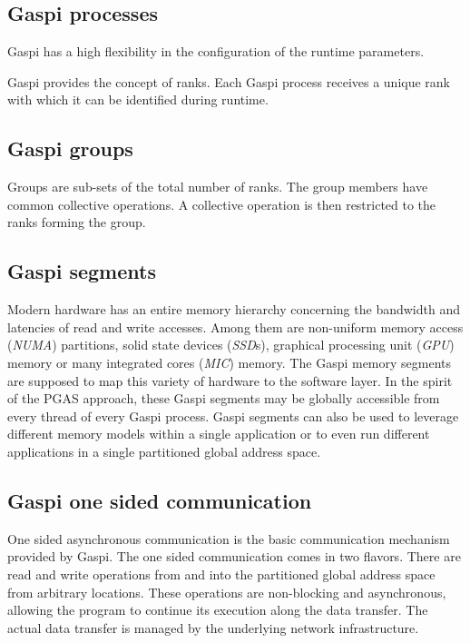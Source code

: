\documentclass{article}
\newlength{\st}\setlength{\st}{0pt}
\newcommand{\GASPI}{{\sc Gaspi}}
\begin{document}
\subsection{\GASPI{} processes}

\GASPI{} has a high flexibility in the configuration of the runtime
parameters.

\GASPI{} provides the concept of ranks. Each \GASPI{} process receives
a unique rank with which it can be identified during runtime.

\subsection{\GASPI{} groups}

Groups are sub-sets of the total number of ranks.  The group members
have common collective operations. A collective operation is then
restricted to the ranks forming the group.

\subsection{\GASPI{} segments}

Modern hardware has an entire memory hierarchy concerning the
bandwidth and latencies of read and write accesses. Among them are
non-uniform memory access (\emph{NUMA}) partitions, solid state
devices (\emph{SSD}s), graphical processing unit (\emph{GPU}) memory
or many integrated cores (\emph{MIC}) memory.  The \GASPI{} memory
segments are supposed to map this variety of hardware to the software
layer. In the spirit of the PGAS approach, these \GASPI{} segments
may be globally accessible from every thread of every \GASPI{} process.
\GASPI{} segments can also be used to leverage different memory models within
a single application or to even run different applications in a single partitioned global 
address space.

\subsection{\GASPI{} one sided communication}

One sided asynchronous communication is the basic communication
mechanism provided by \GASPI{}. The one sided communication comes
in two flavors.  There are read and write operations from and into the
partitioned global address space from arbitrary locations. These
operations are non-blocking and asynchronous, allowing the program to continue
its execution along the data transfer. The actual data transfer is managed
by the underlying network infrastructure.
\end{document}
